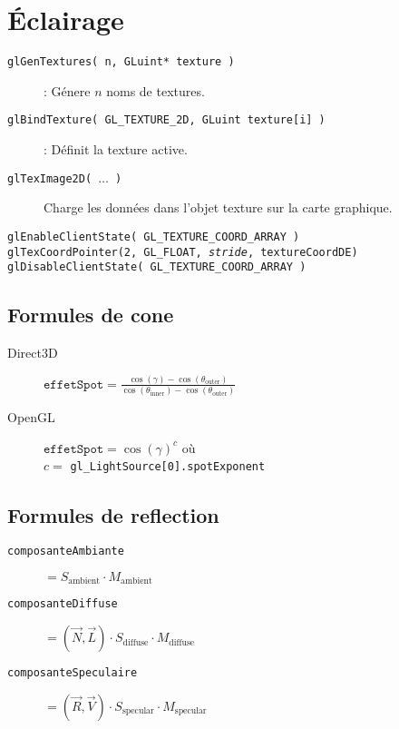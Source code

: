 \documentclass[twocolumn]{article}
\newcommand{\code}[1]{\texttt{#1}}
\begin{document}
\section{Éclairage}
\begin{description}
   \item[\code{glGenTextures( n, GLuint* texture )}] : Génere $n$ noms de textures.
   \item[\code{glBindTexture( GL\_TEXTURE\_2D, GLuint texture[i] )}] : Définit la texture active.
   \item[\code{glTexImage2D( $\dots$ )}] Charge les données dans l'objet texture sur la carte graphique.
	\item[\code{glEnableClientState( GL\_TEXTURE\_COORD\_ARRAY )}]
	\item[\code{glTexCoordPointer(2, GL\_FLOAT, \textit{stride}, textureCoordDE)}]
	\item[\code{glDisableClientState( GL\_TEXTURE\_COORD\_ARRAY )}]

\end{description}

\subsection{Formules de cone}
\begin{description}
   \item[Direct3D] $\code{effetSpot} = \frac{\cos(\gamma) - \cos(\theta_{\textrm{outer}})}{\cos(\theta_{\textrm{inner}}) - \cos(\theta_{\textrm{outer}})}$ 

   \item[OpenGL] $\code{effetSpot} = \cos(\gamma)^{c}$ où \\ $c =$ \code{gl\_LightSource[0].spotExponent}
\end{description}

\subsection{Formules de reflection}
\begin{description}
	\item[\code{composanteAmbiante}] $ = S_{\textrm{ambient}} \cdot M_{\textrm{ambient}} $
	\item[\code{composanteDiffuse}] $ = (\vec{N},\vec{L}) \cdot S_{\textrm{diffuse}} \cdot M_{\textrm{diffuse}} $
	\item[\code{composanteSpeculaire}] $ = (\vec{R},\vec{V}) \cdot S_{\textrm{specular}} \cdot M_{\textrm{specular}} $
\end{description}
\end{document}
